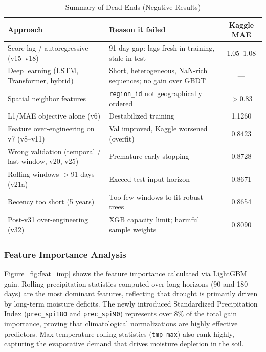 \documentclass[conference]{IEEEtran}
\begin{document}
\begin{table}[htbp]
\caption{Summary of Dead Ends (Negative Results)}
\begin{center}
\begin{tabular}{p{2.2cm}p{3.0cm}c}
\toprule
\textbf{Approach} & \textbf{Reason it failed} & \textbf{Kaggle MAE} \\
\midrule
Score-lag / autoregressive (v15--v18) & 91-day gap: lags fresh in training, stale in test & 1.05--1.08 \\
Deep learning (LSTM, Transformer, hybrid) & Short, heterogeneous, NaN-rich sequences; no gain over GBDT & --- \\
Spatial neighbor features & \texttt{region\_id} not geographically ordered & $>$0.83 \\
L1/MAE objective alone (v6) & Destabilized training & 1.1260 \\
Feature over-engineering on v7 (v8--v11) & Val improved, Kaggle worsened (overfit) & 0.8423 \\
Wrong validation (temporal / last-window, v20, v25) & Premature early stopping & 0.8728 \\
Rolling windows $>$91 days (v21a) & Exceed test input horizon & 0.8671 \\
Recency too short (5 years) & Too few windows to fit robust trees & 0.8654 \\
Post-v31 over-engineering (v32) & XGB capacity limit; harmful sample weights & 0.8090 \\
\bottomrule
\end{tabular}
\label{tab:deadends}
\end{center}
\end{table}

\subsubsection{Feature Importance Analysis}
Figure~\ref{fig:feat_imp} shows the feature importance calculated via LightGBM gain. Rolling precipitation statistics computed over long horizons (90 and 180 days) are the most dominant features, reflecting that drought is primarily driven by long-term moisture deficits. The newly introduced Standardized Precipitation Index (\texttt{prec\_spi180} and \texttt{prec\_spi90}) represents over 8\% of the total gain importance, proving that climatological normalizations are highly effective predictors. Max temperature rolling statistics (\texttt{tmp\_max}) also rank highly, capturing the evaporative demand that drives moisture depletion in the soil.
\end{document}
